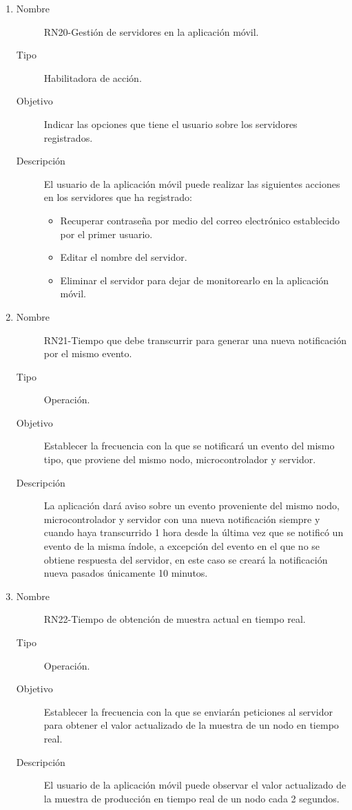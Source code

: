 \begin{enumerate}[label=RN\arabic*.]
\item \label{RN20}
		\begin{description}
			\item[Nombre] RN20-Gestión de servidores en la aplicación móvil.
			\item[Tipo] Habilitadora de acción.
			\item[Objetivo] Indicar las opciones que tiene el usuario sobre los servidores registrados.
			\item[Descripción] El usuario de la aplicación móvil puede realizar las siguientes acciones en los servidores que ha registrado:
			\begin{itemize}
		 		\item Recuperar contraseña por medio del correo electrónico establecido por el primer usuario.
		 		\item Editar el nombre del servidor.
		 		\item Eliminar el servidor para dejar de monitorearlo en la aplicación móvil.
		    \end{itemize}
		\end{description}
\item \label{RN21}
		\begin{description}
			\item[Nombre] RN21-Tiempo que debe transcurrir para generar una nueva notificación por el mismo evento.
			\item[Tipo] Operación.
			\item[Objetivo] Establecer la frecuencia con la que se notificará un evento del mismo tipo, que proviene del mismo nodo, microcontrolador y servidor.
			\item[Descripción] La aplicación dará aviso sobre un evento proveniente del mismo nodo, microcontrolador y servidor con una nueva notificación siempre y cuando haya transcurrido 1 hora desde la última vez que se notificó un evento de la misma índole, a excepción del evento en el que no se obtiene respuesta del servidor, en este caso se creará la notificación nueva pasados únicamente 10 minutos. 
		\end{description}

		
\item \label{RN22}
		\begin{description}
			\item[Nombre] RN22-Tiempo de obtención de muestra actual en tiempo real.
			\item[Tipo] Operación.
			\item[Objetivo] Establecer la frecuencia con la que se enviarán peticiones al servidor para obtener el valor actualizado de la muestra de un nodo en tiempo real.
			\item[Descripción] El usuario de la aplicación móvil puede observar el valor actualizado de la muestra de producción en tiempo real de un nodo cada 2 segundos.
		\end{description}
		

\end{enumerate}
